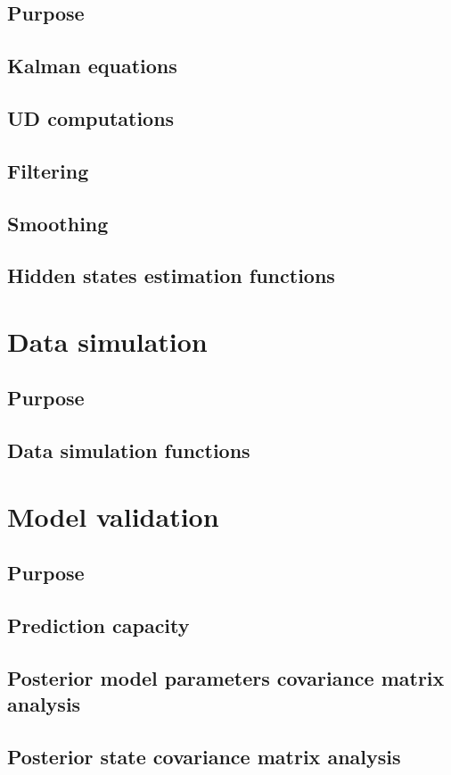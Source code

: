 \documentclass{book}
\begin{document}
\section{Purpose}
\section{Kalman equations}
\section{UD computations}
\section{Filtering}
\section{Smoothing}
\section{Hidden states estimation functions}
\newpage

\chapter{Data simulation}
\section{Purpose}
\section{Data simulation functions}
\newpage

\chapter{Model validation}
\section{Purpose}
\section{Prediction capacity}
\section{Posterior model parameters covariance matrix analysis}
\section{Posterior state covariance matrix analysis}
\end{document}
